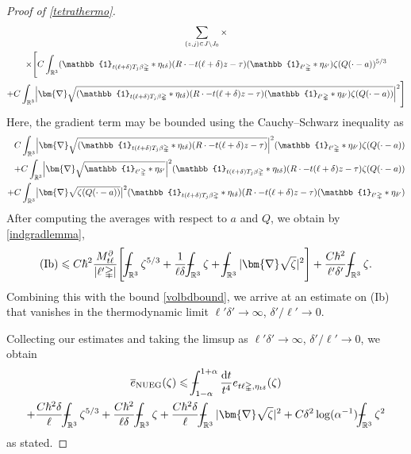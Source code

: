 \documentclass[final,onefignum,onetabnum,reqno]{amsart}
\theoremstyle{remark}
\renewcommand{\le}{\leqslant}
\newcommand{\ol}[1]{\overline{#1}}
\newcommand{\RR}{\mathbb{R}}
\newcommand{\NUEG}{\mathrm{NUEG}} %
\newcommand{\iden}{\mathbb{1}} %
\newcommand{\grad}{\bm{\nabla}} %
\newcommand{\tetra}{\mathbb{\Delta}} %
\newcommand{\dd}{\mathrm{d}} %
\def\Xint#1{\mathchoice
{\XXint\displaystyle\textstyle{#1}}%
{\XXint\textstyle\scriptstyle{#1}}%
{\XXint\scriptstyle\scriptscriptstyle{#1}}%
{\XXint\scriptscriptstyle\scriptscriptstyle{#1}}%
\!\int}
\def\XXint#1#2#3{{\setbox0=\hbox{$#1{#2#3}{\int}$ }
\vcenter{\hbox{$#2#3$ }}\kern-.6\wd0}}
\def\dashint{\Xint-}
\begin{document}
\begin{proof}[Proof of \cref{tetrathermo}]
\begin{multline*}
\sum_{(z,j)\in J\setminus J_0} \times\\
	\times\Bigg[ C\int_{\RR^3}  (\iden_{t(\ell+\delta) T_j \beta\tetra} * \eta_{t\delta})(R\cdot - t(\ell+\delta) z - \tau)(\iden_{\ell'\tetra}*\eta_{\delta'})\zeta(Q(\cdot - a))^{5/3}\\
    + C \int_{\RR^3} \Bigl|\grad\sqrt{(\iden_{t(\ell+\delta) T_j \beta\tetra} * \eta_{t\delta})(R\cdot - t(\ell+\delta) z - \tau)(\iden_{\ell'\tetra}*\eta_{\delta'})\zeta(Q(\cdot - a))}\Bigr|^2 \Bigg]
\end{multline*}
Here, the gradient term may be bounded using the Cauchy--Schwarz inequality as
\begin{align*}
C\int_{\RR^3} \Bigl|\grad\sqrt{(\iden_{t(\ell+\delta) T_j \beta\tetra} * \eta_{t\delta})(R\cdot - t(\ell+\delta) z - \tau)}\Bigr|^2(\iden_{\ell'\tetra}*\eta_{\delta'})\zeta(Q(\cdot - a))\\
+C\int_{\RR^3} \Bigl|\grad\sqrt{\iden_{\ell'\tetra}*\eta_{\delta'}}\Bigr|^2
(\iden_{t(\ell+\delta) T_j \beta\tetra} * \eta_{t\delta})(R\cdot - t(\ell+\delta) z - \tau)\zeta(Q(\cdot - a))\\
+C\int_{\RR^3} \bigl|\grad\sqrt{\zeta(Q(\cdot - a))}\bigr|^2(\iden_{t(\ell+\delta) T_j \beta\tetra} * \eta_{t\delta})(R\cdot - t(\ell+\delta) z - \tau)(\iden_{\ell'\tetra}*\eta_{\delta'})
\end{align*}
After computing the averages with respect to $a$ and $Q$, we obtain by \cref{indgradlemma},
\begin{equation}\label{ebduest}
\mathrm{(Ib)}\le C\hbar^2 \frac{M_{t\ell}^\partial}{|\ell'\tetra|}\Bigg[ \dashint_{\RR^3} \zeta^{5/3} + \frac{1}{\ell\delta}\dashint_{\RR^3}\zeta + \dashint_{\RR^3} |\grad\sqrt{\zeta}|^2\Bigg] + \frac{C\hbar^2}{\ell'\delta'}\dashint_{\RR^3}\zeta.
\end{equation}
Combining this with the bound \cref{volbdbound}, we arrive at an estimate on (Ib) that vanishes in the thermodynamic limit $\ell'\delta'\to\infty$, $\delta'/\ell'\to 0$. 

Collecting our estimates and taking the limsup as $\ell'\delta'\to\infty$, $\delta'/\ell'\to 0$, we obtain
\begin{multline*}
\ol{e}_{\NUEG}(\zeta)\le \dashint_{1-\alpha}^{1+\alpha}\frac{\dd t}{t^4} e_{t\ell\tetra,\eta_{t\delta}}(\zeta)\\
+\frac{C\hbar^2\delta}{\ell} \dashint_{\RR^3}\zeta^{5/3} +  \frac{C\hbar^2}{\ell\delta} \dashint_{\RR^3} \zeta + \frac{C\hbar^2\delta}{\ell}\dashint_{\RR^3} |\grad\sqrt{\zeta}|^2+ C\delta^2\log(\alpha^{-1}) \dashint_{\RR^3}\zeta^2
\end{multline*}
as stated.


\end{proof}
\end{document}
